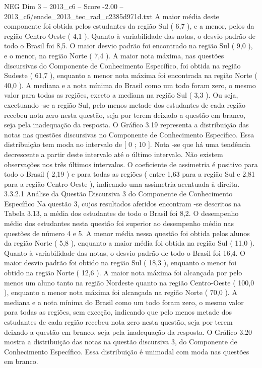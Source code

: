\begin{textsample}{NEG Dim 3 – 2013\_c6 – Score -2.00 – 2013\_c6/enade\_2013\_tec\_rad\_c2385d971d.txt}
A maior média deste componente foi obtida pelos estudantes da região Sul ( 6,7 ), e a menor, pelos da região Centro-Oeste ( 4,1 ).
Quanto à variabilidade das notas, o desvio padrão de todo o Brasil foi 8,5.
O maior desvio padrão foi encontrado na região Sul ( 9,0 ), e o menor, na região Norte ( 7,4 ).
A maior nota máxima, nas questões discursivas do Componente de Conhecimento Específico, foi obtida na região Sudeste ( 61,7 ), enquanto a menor nota máxima foi encontrada na região Norte ( 40,0 ).
A mediana e a nota mínima do Brasil como um todo foram zero, o mesmo valor para todas as regiões, exceto a mediana na região Sul ( 3,3 ).
Ou seja, excetuando -se a região Sul, pelo menos metade dos estudantes de cada região recebeu nota zero nesta questão, seja por terem deixado a questão em branco, seja pela inadequação da resposta.
O Gráfico 3.19 representa a distribuição das notas nas questões discursivas no Componente de Conhecimento Específico.
Essa distribuição tem moda no intervalo de [ 0 ; 10 ].
Nota -se que há uma tendência decrescente a partir deste intervalo até o último intervalo.
Não existem observações nos três últimos intervalos.
O coeficiente de assimetria é positivo para todo o Brasil ( 2,19 ) e para todas as regiões ( entre 1,63 para a região Sul e 2,81 para a região Centro-Oeste ), indicando uma assimetria acentuada à direita. 3.3.2.1 Análise da Questão Discursiva 3 do Componente de Conhecimento Específico Na questão 3, cujos resultados aferidos encontram -se descritos na Tabela 3.13, a média dos estudantes de todo o Brasil foi 8,2.
O desempenho médio dos estudantes nesta questão foi superior ao desempenho médio nas questões de número 4 e 5.
A menor média nessa questão foi obtida pelos alunos da região Norte ( 5,8 ), enquanto a maior média foi obtida na região Sul ( 11,0 ).
Quanto à variabilidade das notas, o desvio padrão de todo o Brasil foi 16,4.
O maior desvio padrão foi obtido na região Sul ( 18,3 ), enquanto o menor foi obtido na região Norte ( 12,6 ).
A maior nota máxima foi alcançada por pelo menos um aluno tanto na região Nordeste quanto na região Centro-Oeste ( 100,0 ), enquanto a menor nota máxima foi alcançada na região Norte ( 70,0 ).
A mediana e a nota mínima do Brasil como um todo foram zero, o mesmo valor para todas as regiões, sem exceção, indicando que pelo menos metade dos estudantes de cada região recebeu nota zero nesta questão, seja por terem deixado a questão em branco, seja pela inadequação da resposta.
O Gráfico 3.20 mostra a distribuição das notas na questão discursiva 3, do Componente de Conhecimento Específico.
Essa distribuição é unimodal com moda nas questões em branco.

\end{textsample}
